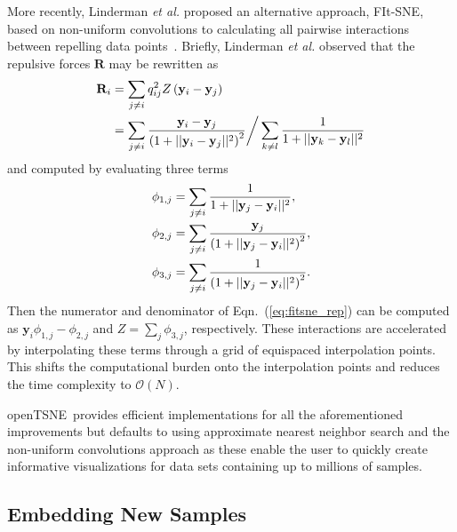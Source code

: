 \documentclass[twocolumn]{bmcart}
\newcommand{\opentsne}{\textsf{openTSNE}}
\begin{document}
More recently, Linderman \textit{et al.} proposed an alternative approach, FIt-SNE, based on non-uniform convolutions to calculating all pairwise interactions between repelling data points~\cite{linderman2019fast}. Briefly, Linderman \textit{et al.} observed that the repulsive forces $\mathbf{R}$ may be rewritten as
\begin{align}
\mathbf{R}_i &= \sum_{j \neq i} q_{ij}^2 Z \left ( \mathbf{y}_i - \mathbf{y}_j \right ) \notag \\
&= \sum_{j \neq i} \frac{\mathbf{y}_i - \mathbf{y}_j}{\left ( 1 + || \mathbf{y}_i - \mathbf{y}_j ||^2 \right )^{2}}
\bigg/
\sum_{k \neq l} \frac{1}{1 + || \mathbf{y}_k - \mathbf{y}_l || ^2} \label{eq:fitsne_rep}
\end{align} 
and computed by evaluating three terms
\begin{align}
\phi_{1, j} &= \sum_{j \neq i} \frac{1}{1 + || \mathbf{y}_j - \mathbf{y}_i ||^2}, \notag \\
\phi_{2, j} &= \sum_{j \neq i} \frac{\mathbf{y}_j}{\left( 1 + || \mathbf{y}_j - \mathbf{y}_i ||^2 \right)^2}, \notag \\
\phi_{3, j} &= \sum_{j \neq i} \frac{1}{\left( 1 + || \mathbf{y}_j - \mathbf{y}_i ||^2 \right)^2}. \label{eq:fitsne_terms}
\end{align}
Then the numerator and denominator of Eqn.~(\ref{eq:fitsne_rep}) can be computed as $\mathbf{y}_i \phi_{1,j} - \phi_{2,j}$ and $Z = \sum_j \phi_{3,j}$, respectively. These interactions are accelerated by interpolating these terms through a grid of equispaced interpolation points. This shifts the computational burden onto the interpolation points and reduces the time complexity to $\mathcal{O}(N)$.

\opentsne\ provides efficient implementations for all the aforementioned improvements but defaults to using approximate nearest neighbor search and the non-uniform convolutions approach as these enable the user to quickly create informative visualizations for data sets containing up to millions of samples.

\subsection*{Embedding New Samples}
\end{document}
